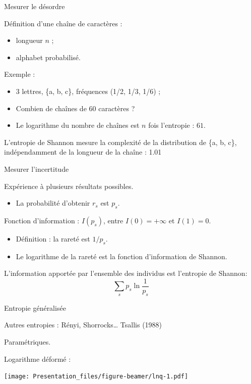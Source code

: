 \documentclass[ignorenonframetext,]{beamer}
\providecommand{\tightlist}{%
  \setlength{\itemsep}{0pt}\setlength{\parskip}{0pt}}
\begin{document}
\begin{frame}{Mesurer le désordre}

Définition d'une chaîne de caractères :

\begin{itemize}
\item
  longueur \(n\) ;
\item
  alphabet probabilisé.
\end{itemize}

Exemple :

\begin{itemize}
\item
  3 lettres, \{a, b, c\}, fréquences (1/2, 1/3, 1/6) ;
\item
  Combien de chaînes de 60 caractères ?
\item
  Le logarithme du nombre de chaînes est \(n\) fois l'entropie : \(61\).
\end{itemize}

L'entropie de Shannon mesure la complexité de la distribution de \{a, b,
c\}, indépendamment de la longueur de la chaîne : 1.01

\end{frame}

\begin{frame}{Mesurer l'incertitude}

Expérience à plusieurs résultats possibles.

\begin{itemize}
\tightlist
\item
  La probabilité d'obtenir \(r_s\) est \(p_s\).
\end{itemize}

Fonction d'information : \(I(p_s)\), entre \(I(0)=+\infty\) et
\(I(1)=0\).

\begin{itemize}
\item
  Définition : la rareté est \(1/p_s\).
\item
  Le logarithme de la rareté est la fonction d'information de Shannon.
\end{itemize}

L'information apportée par l'ensemble des individus est l'entropie de
Shannon: \[\sum_s{p_s \ln {\frac{1}{p_s}}}\]

\end{frame}

\begin{frame}{Entropie généralisée}

Autres entropies : Rényi, Shorrocks\ldots{} Tsallis (1988)

Paramétriques.

Logarithme déformé :

\texttt{[image: Presentation\_files/figure-beamer/lnq-1.pdf]}

\end{frame}
\end{document}
